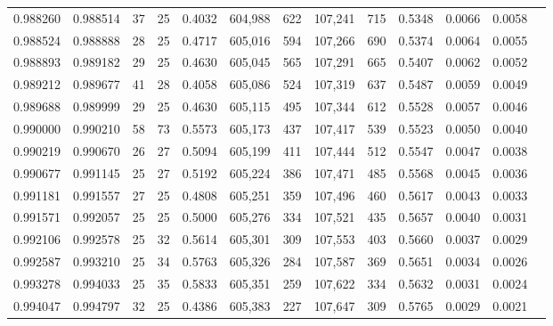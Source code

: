 \begin{tabular}{rrrrrrrrrrrrr}
0.988260 & 0.988514 &    37 &  25 &                                     0.4032 & 604,988 &     622 & 107,241 &     715 & 0.5348 & 0.0066 & 0.0058 \\
0.988524 & 0.988888 &    28 &  25 &                                     0.4717 & 605,016 &     594 & 107,266 &     690 & 0.5374 & 0.0064 & 0.0055 \\
0.988893 & 0.989182 &    29 &  25 &                                     0.4630 & 605,045 &     565 & 107,291 &     665 & 0.5407 & 0.0062 & 0.0052 \\
0.989212 & 0.989677 &    41 &  28 &                                     0.4058 & 605,086 &     524 & 107,319 &     637 & 0.5487 & 0.0059 & 0.0049 \\
0.989688 & 0.989999 &    29 &  25 &                                     0.4630 & 605,115 &     495 & 107,344 &     612 & 0.5528 & 0.0057 & 0.0046 \\
0.990000 & 0.990210 &    58 &  73 &                                     0.5573 & 605,173 &     437 & 107,417 &     539 & 0.5523 & 0.0050 & 0.0040 \\
0.990219 & 0.990670 &    26 &  27 &                                     0.5094 & 605,199 &     411 & 107,444 &     512 & 0.5547 & 0.0047 & 0.0038 \\
0.990677 & 0.991145 &    25 &  27 &                                     0.5192 & 605,224 &     386 & 107,471 &     485 & 0.5568 & 0.0045 & 0.0036 \\
0.991181 & 0.991557 &    27 &  25 &                                     0.4808 & 605,251 &     359 & 107,496 &     460 & 0.5617 & 0.0043 & 0.0033 \\
0.991571 & 0.992057 &    25 &  25 &                                     0.5000 & 605,276 &     334 & 107,521 &     435 & 0.5657 & 0.0040 & 0.0031 \\
0.992106 & 0.992578 &    25 &  32 &                                     0.5614 & 605,301 &     309 & 107,553 &     403 & 0.5660 & 0.0037 & 0.0029 \\
0.992587 & 0.993210 &    25 &  34 &                                     0.5763 & 605,326 &     284 & 107,587 &     369 & 0.5651 & 0.0034 & 0.0026 \\
0.993278 & 0.994033 &    25 &  35 &                                     0.5833 & 605,351 &     259 & 107,622 &     334 & 0.5632 & 0.0031 & 0.0024 \\
0.994047 & 0.994797 &    32 &  25 &                                     0.4386 & 605,383 &     227 & 107,647 &     309 & 0.5765 & 0.0029 & 0.0021 \\

\end{tabular}
